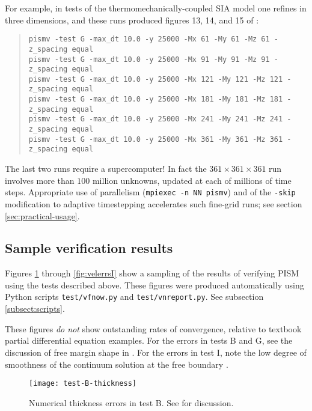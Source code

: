 For example, in tests of the thermomechanically-coupled SIA model one refines in three dimensions, and these runs produced figures 13, 14, and 15 of \cite{BBL}:
\begin{quote}\small
\begin{verbatim}
pismv -test G -max_dt 10.0 -y 25000 -Mx 61 -My 61 -Mz 61 -z_spacing equal
pismv -test G -max_dt 10.0 -y 25000 -Mx 91 -My 91 -Mz 91 -z_spacing equal
pismv -test G -max_dt 10.0 -y 25000 -Mx 121 -My 121 -Mz 121 -z_spacing equal
pismv -test G -max_dt 10.0 -y 25000 -Mx 181 -My 181 -Mz 181 -z_spacing equal
pismv -test G -max_dt 10.0 -y 25000 -Mx 241 -My 241 -Mz 241 -z_spacing equal
pismv -test G -max_dt 10.0 -y 25000 -Mx 361 -My 361 -Mz 361 -z_spacing equal
\end{verbatim}
\normalsize\end{quote}
The last two runs require a supercomputer!  In fact the $361\times 361\times 361$ run involves more than $100$ million unknowns, updated at each of millions of time steps. Appropriate use of parallelism (\texttt{mpiexec -n NN pismv}) and of the \texttt{-skip} modification to adaptive timestepping accelerates such fine-grid runs; see section \ref{sec:practical-usage}.


\subsection{Sample verification results}  Figures \ref{fig:thickerrsB} through
\ref{fig:velerrsI} show a sampling of the results of verifying PISM using the
tests described above.  These
figures were produced automatically using Python scripts
\texttt{test/vfnow.py}  and \texttt{test/vnreport.py}.  See subsection \ref{subsect:scripts}.

These figures \emph{do not} show outstanding rates of convergence, relative to textbook partial differential equation examples.  For the errors in tests B and G, see the discussion of free margin shape in \cite{BLKCB}.  For the errors in test I, note the low degree of smoothness of the continuum solution at the free boundary \cite{SchoofStream}.  

\begin{figure}[ht]
\centering
\texttt{[image: test-B-thickness]}
\caption{Numerical thickness errors in test B. See \cite{BLKCB} for discussion.}
\label{fig:thickerrsB}
\end{figure}

